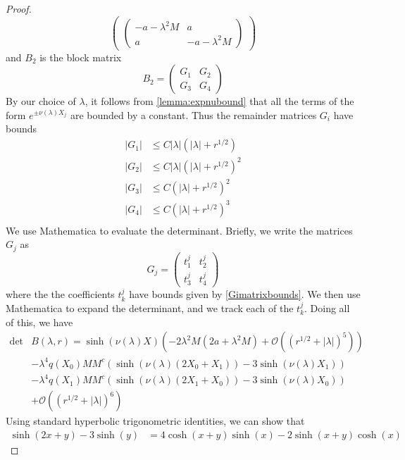 \documentclass[thesis.tex]{subfiles}
\begin{document}
\begin{lemma}
\begin{proof}
\[\begin{pmatrix}
\begin{pmatrix}
-a - \lambda^2 M & a \\
a & -a - \lambda^2 M
\end{pmatrix}
\end{pmatrix}
\]
and $B_2$ is the block matrix 
\[
B_2 = \begin{pmatrix}
G_1 & G_2 \\ G_3 & G_4
\end{pmatrix}
\]
By our choice of $\lambda$, it follows from \cref{lemma:expnubound} that all the terms of the form $e^{\pm \nu(\lambda)X_j}$ are bounded by a constant. Thus the remainder matrices $G_i$ have bounds
\begin{equation}\label{Gimatrixbounds}
\begin{aligned}
|G_1| &\leq C |\lambda| (|\lambda| + r^{1/2} )\\
|G_2| &\leq C |\lambda| (|\lambda| + r^{1/2} )^2 \\
|G_3| &\leq C (|\lambda| + r^{1/2} )^2 \\
|G_4| &\leq C (|\lambda| + r^{1/2} )^3 \\
\end{aligned}
\end{equation}
We use Mathematica to evaluate the determinant. Briefly, we write the matrices $G_j$ as
\[
G_j = \begin{pmatrix}t^j_1 & t^j_2 \\ t^j_3 & t^j_4 \end{pmatrix}
\]
where the the coefficients $t^j_k$ have bounds given by \cref{Gimatrixbounds}. We then use Mathematica to expand the determinant, and we track each of the $t^j_k$. Doing all of this, we have
\begin{equation}\label{2detB1}
\begin{aligned}
\det &B(\lambda, r) = \sinh(\nu(\lambda)X)\left(-2 \lambda^2 M (2a + \lambda^2 M) +  \mathcal{O}( (r^{1/2} + |\lambda|)^5 )\right) \\
&-\lambda^4 q(X_0) M M^c \left( \sinh(\nu(\lambda)(2 X_0 + X_1)) - 3 \sinh(\nu(\lambda)X_1)  \right) \\
&-\lambda^4 q(X_1) M M^c \left( \sinh(\nu(\lambda)(2 X_1 + X_0)) - 3 \sinh(\nu(\lambda)X_0)  \right) \\
&+ \mathcal{O}( (r^{1/2} + |\lambda|)^6) 
\end{aligned}
\end{equation}
Using standard hyperbolic trigonometric identities, we can show that 
\begin{align*}
\sinh(2 x + y) - 3 \sinh(y) &= 4 \cosh(x + y)\sinh(x) 
-2 \sinh(x+y)\cosh(x) 

\end{align*}
\end{proof}
\end{lemma}
\end{document}
